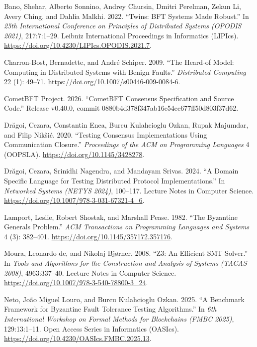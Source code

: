 \documentclass[10pt,a4paper]{article}
\newlength{\cslhangindent}
\newenvironment{CSLReferences}[2]
 {\begin{list}{}{%
  \setlength{\itemindent}{0pt}
  \setlength{\leftmargin}{0pt}
  \setlength{\parsep}{0pt}
  \ifodd #1
   \setlength{\leftmargin}{\cslhangindent}
   \setlength{\itemindent}{-1\cslhangindent}
  \fi
  \setlength{\itemsep}{#2\baselineskip}}}
 {\end{list}}
\begin{document}
\label{refs}
\begin{CSLReferences}{1}{0}
Bano, Shehar, Alberto Sonnino, Andrey Chursin, Dmitri Perelman, Zekun
Li, Avery Ching, and Dahlia Malkhi. 2022. {``Twins: {BFT} Systems Made
Robust.''} In \emph{25th International Conference on Principles of
Distributed Systems (OPODIS 2021)}, 217:7:1--29. Leibniz International
Proceedings in Informatics (LIPIcs).
\url{https://doi.org/10.4230/LIPIcs.OPODIS.2021.7}.

Charron-Bost, Bernadette, and André Schiper. 2009. {``The Heard-of
Model: Computing in Distributed Systems with Benign Faults.''}
\emph{Distributed Computing} 22 (1): 49--71.
\url{https://doi.org/10.1007/s00446-009-0084-6}.

CometBFT Project. 2026. {``CometBFT Consensus Specification and Source
Code.''} Release v0.40.0, commit
0880b4d378f347ab16e54ec677ff50d803f37d62.

Drăgoi, Cezara, Constantin Enea, Burcu Kulahcioglu Ozkan, Rupak
Majumdar, and Filip Nikšić. 2020. {``Testing Consensus Implementations
Using Communication Closure.''} \emph{Proceedings of the ACM on
Programming Languages} 4 (OOPSLA).
\url{https://doi.org/10.1145/3428278}.

Drăgoi, Cezara, Srinidhi Nagendra, and Mandayam Srivas. 2024. {``A
Domain Specific Language for Testing Distributed Protocol
Implementations.''} In \emph{Networked Systems (NETYS 2024)}, 100--117.
Lecture Notes in Computer Science.
\url{https://doi.org/10.1007/978-3-031-67321-4_6}.

Lamport, Leslie, Robert Shostak, and Marshall Pease. 1982. {``The
Byzantine Generals Problem.''} \emph{ACM Transactions on Programming
Languages and Systems} 4 (3): 382--401.
\url{https://doi.org/10.1145/357172.357176}.

Moura, Leonardo de, and Nikolaj Bjørner. 2008. {``Z3: An Efficient SMT
Solver.''} In \emph{Tools and Algorithms for the Construction and
Analysis of Systems (TACAS 2008)}, 4963:337--40. Lecture Notes in
Computer Science. \url{https://doi.org/10.1007/978-3-540-78800-3_24}.

Neto, João Miguel Louro, and Burcu Kulahcioglu Ozkan. 2025. {``A
Benchmark Framework for Byzantine Fault Tolerance Testing Algorithms.''}
In \emph{6th International Workshop on Formal Methods for Blockchains
(FMBC 2025)}, 129:13:1--11. Open Access Series in Informatics (OASIcs).
\url{https://doi.org/10.4230/OASIcs.FMBC.2025.13}.


\end{CSLReferences}
\end{document}
